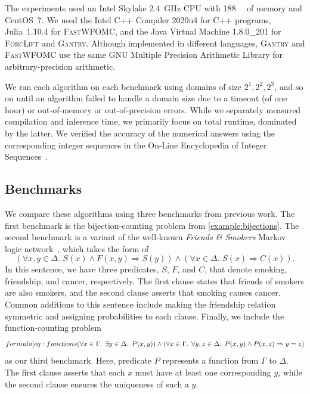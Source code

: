 \documentclass[a4paper,UKenglish,cleveref,autoref,thm-restate]{lipics-v2021}
\newcommand{\Cranetwo}{\textsc{Gantry}}
\newcommand{\friends}{\emph{Friends \& Smokers}}
\begin{document}
The experiments used an Intel Skylake \SI{2.4}{\giga\hertz} CPU with
\SI{188}{\gibi\byte} of memory and CentOS~7. We used the Intel C++ Compiler
2020u4 for C++ programs, Julia~1.10.4 for \textsc{FastWFOMC}, and the Java
Virtual Machine 1.8.0\_201 for \textsc{ForcLift} and \Cranetwo{}. Although
implemented in different languages, \Cranetwo{} and \textsc{FastWFOMC} use the
same GNU Multiple Precision Arithmetic Library for arbitrary-precision
arithmetic.

We ran each algorithm on each benchmark using domains of size
$2^{1}, 2^{2}, 2^{3}$, and so on until an algorithm failed to handle a domain
size due to a timeout (of one hour) or out-of-memory or out-of-precision errors.
While we separately measured compilation and inference time, we primarily focus
on total runtime, dominated by the latter. We verified the accuracy of the
numerical answers using the corresponding integer sequences in the On-Line
Encyclopedia of Integer Sequences~\cite{oeis}.

\subsection{Benchmarks}

We compare these algorithms using three benchmarks from previous work. The first
benchmark is the bijection-counting problem from \cref{example:bijections}. The
second benchmark is a variant of the well-known \friends{} Markov logic
network~\cite{DBLP:conf/aaai/SinglaD08,DBLP:conf/uai/BroeckCD12}, which takes
the form of
\[
  (\forall x,y \in \Delta\text{.
  } S(x) \land F(x, y) \Rightarrow S(y)) \land (\forall x \in \Delta\text{.
  }S(x) \Rightarrow C(x)).
\]
In this sentence, we have three predicates, $S$, $F$, and $C$, that denote
smoking, friendship, and cancer, respectively. The first clause states that
friends of smokers are also smokers, and the second clause asserts that smoking
causes cancer. Common additions to this sentence include making the friendship
relation symmetric and assigning probabilities to each clause. Finally, we
include the function-counting problem~\cite{DBLP:conf/kr/DilkasB23}
\begin{equation}\label[formula]{eq:functions}
  (\forall x \in \Gamma\text{. }\exists y \in \Delta\text{.
  }P(x, y)) \land (\forall x \in \Gamma\text{. }\forall y, z \in \Delta\text{.
  }P(x, y) \land P(x, z) \Rightarrow y = z)
\end{equation}
as our third benchmark. Here, predicate $P$ represents a function from $\Gamma$
to $\Delta$. The first clause asserts that each $x$ must have at least one
corresponding $y$, while the second clause ensures the uniqueness of such a $y$.
\end{document}
